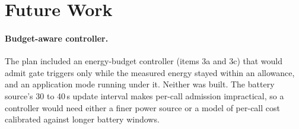 \section{Future Work}
\label{sec:future}

\paragraph{Budget-aware controller.}
The plan included an energy-budget controller (items 3a and 3c) that would admit gate triggers only while the measured energy stayed within an allowance, and an application mode running under it.
Neither was built.
The battery source's 30 to 40\,s update interval makes per-call admission impractical, so a controller would need either a finer power source or a model of per-call cost calibrated against longer battery windows.

